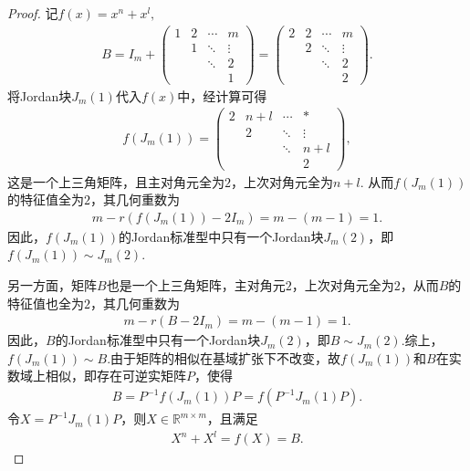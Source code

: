\documentclass[../../main.tex]{subfiles}%
\begin{document}
\begin{proof}
记$f(x) = x^n + x^l,$
\begin{align*}
B = I_m + \begin{pmatrix}1 & 2 & \cdots & m\\ & 1 & \ddots & \vdots\\ & & \ddots & 2\\ & & & 1\end{pmatrix} = \begin{pmatrix}2 & 2 & \cdots & m\\ & 2 & \ddots & \vdots\\ & & \ddots & 2\\ & & & 2\end{pmatrix}.
\end{align*}
将Jordan块$J_m(1)$代入$f(x)$中，经计算可得
\begin{align*}
f(J_m(1)) = \begin{pmatrix}2 & n+l & \cdots & *\\ & 2 & \ddots & \vdots\\ & & \ddots & n+l\\ & & & 2\end{pmatrix},
\end{align*}
这是一个上三角矩阵，且主对角元全为$2$，上次对角元全为$n+l$.
从而$f(J_m(1))$的特征值全为$2$，其几何重数为
\begin{align*}
m - r(f(J_m(1)) - 2I_m) = m - (m - 1) = 1.
\end{align*}
因此，$f(J_m(1))$的Jordan标准型中只有一个Jordan块$J_m(2)$，即$f(J_m(1)) \sim J_m(2)$.

另一方面，矩阵$B$也是一个上三角矩阵，主对角元$2$，上次对角元全为$2$，从而$B$的特征值也全为$2$，其几何重数为
\begin{align*}
m - r(B - 2I_m) = m - (m - 1) = 1.
\end{align*}
因此，$B$的Jordan标准型中只有一个Jordan块$J_m(2)$，即$B \sim J_m(2)$.综上，$f(J_m(1)) \sim B$.由于矩阵的相似在基域扩张下不改变，故$f(J_m(1))$和$B$在实数域上相似，即存在可逆实矩阵$P$，使得
\begin{align*}
B = P^{-1}f(J_m(1))P = f(P^{-1}J_m(1)P).
\end{align*}
令$X = P^{-1}J_m(1)P$，则$X \in \mathbb{R}^{m \times m}$，且满足
\begin{align*}
X^n + X^l = f(X) = B.
\end{align*}
\end{proof}
\end{document}
